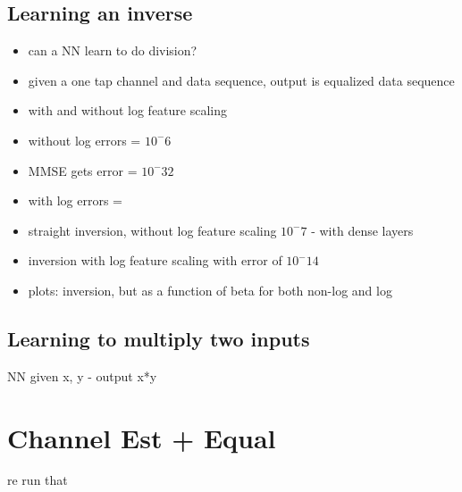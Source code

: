 \subsection{Learning an inverse}
\begin{itemize}
\item can a NN learn to do division?
\item given a one tap channel and data sequence, output is equalized data sequence
\item with and without log feature scaling
\item without log errors = $10^-6$
\item MMSE gets error = $10^-32$
\item with log errors = 
\item straight inversion, without log feature scaling $10^-7$ - with dense layers
\item inversion with log feature scaling with error of $10^-14$ 
\item plots: inversion, but as a function of beta for both non-log and log
\end{itemize}

\subsection{Learning to multiply two inputs}
NN given x, y - output x*y

\section{Channel Est + Equal}
re run that 